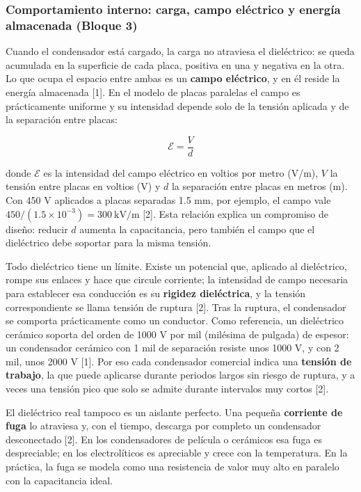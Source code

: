 \documentclass[11pt,letterpaper]{article}
\begin{document}
\subsubsection{Comportamiento interno: carga, campo eléctrico y energía almacenada (Bloque 3)}

Cuando el condensador está cargado, la carga no atraviesa el dieléctrico: se queda acumulada en la superficie de cada placa, positiva en una y negativa en la otra. Lo que ocupa el espacio entre ambas es un \textbf{campo eléctrico}, y en él reside la energía almacenada [1]. En el modelo de placas paralelas el campo es prácticamente uniforme y su intensidad depende solo de la tensión aplicada y de la separación entre placas:

\begin{equation}
  \mathcal{E} = \frac{V}{d}
\end{equation}

donde $\mathcal{E}$ es la intensidad del campo eléctrico en voltios por metro (V/m), $V$ la tensión entre placas en voltios (V) y $d$ la separación entre placas en metros (m). Con 450 V aplicados a placas separadas 1.5 mm, por ejemplo, el campo vale $450 / (1.5 \times 10^{-3}) = 300\ \text{kV/m}$ [2]. Esta relación explica un compromiso de diseño: reducir $d$ aumenta la capacitancia, pero también el campo que el dieléctrico debe soportar para la misma tensión.

Todo dieléctrico tiene un límite. Existe un potencial que, aplicado al dieléctrico, rompe sus enlaces y hace que circule corriente; la intensidad de campo necesaria para establecer esa conducción es su \textbf{rigidez dieléctrica}, y la tensión correspondiente se llama tensión de ruptura [2]. Tras la ruptura, el condensador se comporta prácticamente como un conductor. Como referencia, un dieléctrico cerámico soporta del orden de 1000 V por mil (milésima de pulgada) de espesor: un condensador cerámico con 1 mil de separación resiste unos 1000 V, y con 2 mil, unos 2000 V [1]. Por eso cada condensador comercial indica una \textbf{tensión de trabajo}, la que puede aplicarse durante periodos largos sin riesgo de ruptura, y a veces una tensión pico que solo se admite durante intervalos muy cortos [2].

El dieléctrico real tampoco es un aislante perfecto. Una pequeña \textbf{corriente de fuga} lo atraviesa y, con el tiempo, descarga por completo un condensador desconectado [2]. En los condensadores de película o cerámicos esa fuga es despreciable; en los electrolíticos es apreciable y crece con la temperatura. En la práctica, la fuga se modela como una resistencia de valor muy alto en paralelo con la capacitancia ideal.
\end{document}
